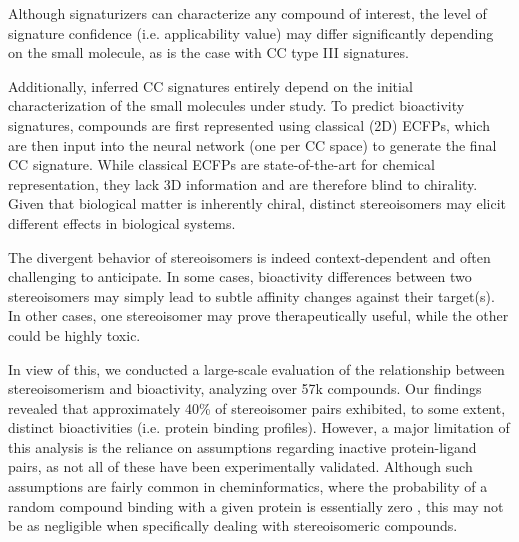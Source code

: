 Although signaturizers can characterize any compound of interest, the level of signature confidence (i.e. applicability value) may differ significantly depending on the small molecule, as is the case with CC type III signatures. 


Additionally, inferred CC signatures entirely depend on the initial characterization of the small molecules under study. To predict bioactivity signatures, compounds are first represented using classical (2D) ECFPs, which are then input into the neural network (one per CC space) to generate the final CC signature. While classical ECFPs are state-of-the-art for chemical representation, they lack 3D information and are therefore blind to chirality. Given that biological matter is inherently chiral, distinct stereoisomers may elicit different effects in biological systems. 

The divergent behavior of stereoisomers is indeed context-dependent and often challenging to anticipate. In some cases, bioactivity differences between two stereoisomers may simply lead to subtle affinity changes against their target(s). In other cases, one stereoisomer may prove therapeutically useful, while the other could be highly toxic. 

In view of this, we conducted a large-scale evaluation of the relationship between stereoisomerism and bioactivity, analyzing over 57k compounds. Our findings revealed that approximately 40\% of stereoisomer pairs exhibited, to some extent, distinct bioactivities (i.e. protein binding profiles). However, a major limitation of this analysis is the reliance on assumptions regarding inactive protein-ligand pairs, as not all of these have been experimentally validated. Although such assumptions are fairly common in cheminformatics, where the probability of a random compound binding with a given protein is essentially zero \cite{dobson_chemical_2004}, this may not be as negligible when specifically dealing with stereoisomeric compounds. 

